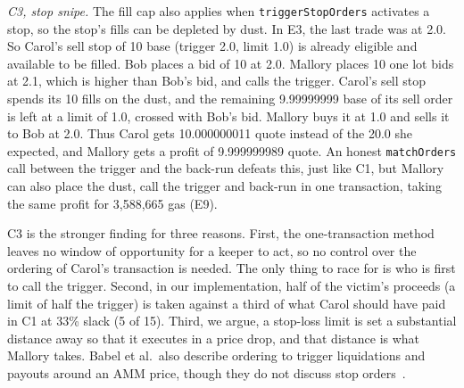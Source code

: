 \emph{C3, stop snipe.}
The fill cap also applies when \texttt{triggerStopOrders} activates a stop, so the stop's fills can be depleted by dust. %
In E3, the last trade was at 2.0. So Carol's sell stop of 10 base (trigger 2.0, limit 1.0) is already eligible and available to be filled. %
Bob places a bid of 10 at 2.0.
Mallory places 10 one lot bids at 2.1, which is higher than Bob's bid, and calls the trigger. %
Carol's sell stop spends its 10 fills on the dust, and the remaining 9.99999999 base of its sell order is left at a limit of 1.0, crossed with Bob's bid. %
Mallory buys it at 1.0 and sells it to Bob at 2.0.
Thus Carol gets 10.000000011 quote instead of the 20.0 she expected, and Mallory gets a profit of 9.999999989 quote. %
An honest \texttt{matchOrders} call between the trigger and the back-run defeats this, just like C1, but Mallory can also place the dust, call the trigger and back-run in one transaction, taking the same profit for 3{,}588{,}665 gas (E9). %

C3 is the stronger finding for three reasons. %
First, the one-transaction method leaves no window of opportunity for a keeper to act, so no control over the ordering of Carol's transaction is needed. The only thing to race for is who is first to call the trigger. %
Second, in our implementation, half of the victim's proceeds (a limit of half the trigger) is taken against a third of what Carol should have paid in C1 at 33\% slack (5 of 15). %
Third, we argue, a stop-loss limit is set a substantial distance away so that it executes in a price drop, and that distance is what Mallory takes. %
Babel et al.\ also describe ordering to trigger liquidations and payouts around an AMM price, though they do not discuss stop orders~\cite{src08babel2023}. %

